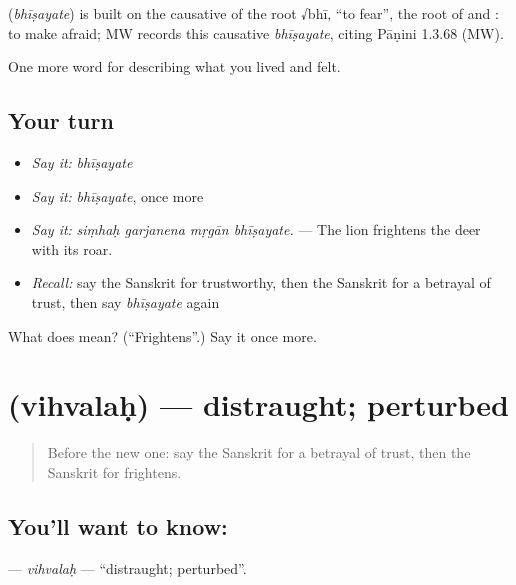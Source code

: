 \begin{cousinweb}
\textbf{} (\emph{bhīṣayate}) is built on the causative of the root √bhī, \textquotedblleft{}to fear\textquotedblright{}, the root of \textbf{} and \textbf{}: to make afraid; MW records this causative \emph{bhīṣayate}, citing Pāṇini 1.3.68 (MW).
\end{cousinweb}

\begin{grammarlens}[title={What you've built}]
One more word for describing what you lived and felt.
\end{grammarlens}

\subsection*{Your turn}
\begin{itemize}
\raggedright
  \item \emph{Say it:} \emph{bhīṣayate}
  \item \emph{Say it:} \emph{bhīṣayate}, once more
  \item \emph{Say it:} \emph{siṃhaḥ garjanena mṛgān bhīṣayate.} — The lion frightens the deer with its roar.
  \item \emph{Recall:} say the Sanskrit for trustworthy, then the Sanskrit for a betrayal of trust, then say \emph{bhīṣayate} again
\end{itemize}

\begin{tcolorbox}[breakable,colback=teal!4,colframe=teal!35!black,title={Before you move on}]
What does  mean? (\textquotedblleft{}Frightens\textquotedblright{}.) Say it once more.
\end{tcolorbox}
\section[\texorpdfstring{\sk{विह्वलः} (vihvalaḥ)}{विह्वलः (vihvalaḥ)}]{ (vihvalaḥ) — distraught; perturbed}

\label{lesson:SA-C463-vihvalah}



\begin{quote}
Before the new one: say the Sanskrit for a betrayal of trust, then the Sanskrit for frightens.
\end{quote}

\subsection*{You'll want to know: }
\textbf{} — \emph{vihvalaḥ} — \textquotedblleft{}distraught; perturbed\textquotedblright{}.

